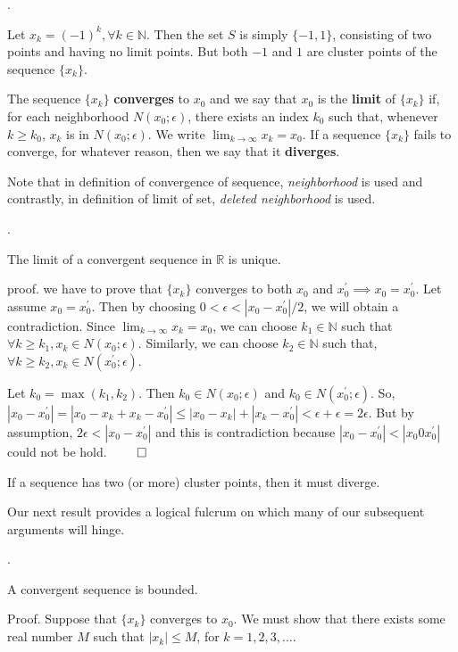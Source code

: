 \documentclass[8pt]{beamer}
\newcommand{\mbb}[1]{\mathbb{#1}}
\newcommand{\tb}[1]{\textbf{#1}}
\newcommand{\ti}[1]{\textit{#1}}
\newcommand{\abs}[1]{\left\lvert #1 \right\rvert}
\begin{document}
\begin{frame}{.}
    \begin{example}
        Let $x_k = (-1)^k, \forall k \in \mbb{N}$.
        Then the set $S$ is simply $\{-1, 1\}$, consisting of two points and having no limit points.
        But both $-1$ and $1$ are cluster points of the sequence $\{x_k\}$.
    \end{example}

    \begin{definition}
        The sequence $\{x_k\}$ \tb{converges} to $x_0$ and we say that $x_0$ is the \tb{limit} of $
        \{x_k\}$ if, for each neighborhood $N(x_0; \epsilon)$, there exists an index $k_0$ such that, whenever $k \geq k_0$, $x_k$ is in $N(x_0; \epsilon)$.
        We write $\lim_{k \to \infty} x_k = x_0$.
        If a sequence $\{x_k\}$ fails to converge, for whatever reason, then we say that it \tb{diverges}.
    \end{definition}

    Note that in definition of convergence of sequence, \ti{neighborhood} is used and contrastly, in definition of limit of set, \ti{deleted neighborhood} is used.

\end{frame}

\begin{frame}{.}
    \begin{theorem}
        The limit of a convergent sequence in $\mbb{R}$ is unique.

        proof. we have to prove that $\{x_k\}$ converges to both $x_0$ and $x_0^\prime \implies x_0 = x_0^\prime$.
        Let assume $x_0 = x_0^\prime$.
        Then by choosing $0 < \epsilon < \abs{x_0 - x_0^\prime}/2$, we will obtain a contradiction.
        Since $\lim_{k \to \infty} x_k = x_0$, we can choose $k_1 \in \mbb{N}$ such that $\forall k \geq k_1, x_k \in N(x_0; \epsilon)$.
        Similarly, we can choose $k_2 \in \mbb{N}$ such that, $\forall k \geq k_2, x_k \in N(x_0^\prime; \epsilon)$.

        Let $k_0 = \max(k_1, k_2)$.
        Then $k_0 \in N(x_0; \epsilon)$ and $k_0 \in N(x_0^\prime; \epsilon)$.
        So, $\abs{x_0 - x_0^\prime} = \abs{x_0 - x_k + x_k - x_0^\prime} \leq \abs{x_0 - x_k} + \abs{x_k - x_0^\prime} < \epsilon + \epsilon = 2\epsilon$.
        But by assumption, $2\epsilon < \abs{x_0 - x_0^\prime}$ and this is contradiction because $\abs{x_0 - x_0^\prime} < \abs{x_0 0 x_0^\prime}$ could not be hold.
        $\qed$
    \end{theorem}

    \begin{theorem}
        If a sequence has two (or more) cluster points, then it must diverge.

        \smallskip
        Our next result provides a logical fulcrum on which many of our subsequent arguments will hinge.
    \end{theorem}

\end{frame}

\begin{frame}{.}
    \begin{theorem}
        A convergent sequence is bounded.

        Proof. Suppose that $\{x_k\}$ converges to $x_0$.
        We must show that there exists some real number $M$ such that $\abs{x_k} \leq M$, for $k=1,2,3,\dots$.
    \end{theorem}
\end{frame}
\end{document}
